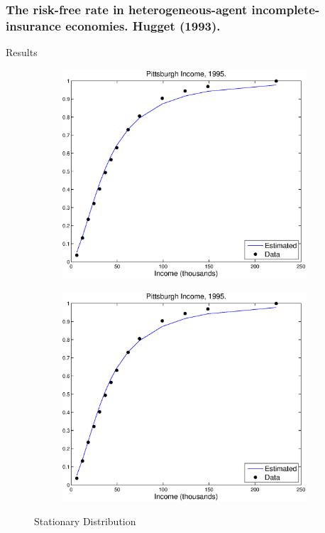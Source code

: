 \documentclass{beamer}
\begin{document}
\frame
{
  \frametitle{ The risk-free rate in heterogeneous-agent incomplete-insurance economies. Hugget (1993).}
Results 
\begin{figure}
        \begin{subfigure}[b]{0.5\textwidth}
                \includegraphics[width=\textwidth]{GLN4Fy.eps}
        \end{subfigure}%
        \begin{subfigure}[b]{0.5\textwidth}
                \includegraphics[width=\textwidth]{GLN4Fy.eps}
        \end{subfigure}
        \caption{Stationary Distribution}
\end{figure}
}
\end{document}
